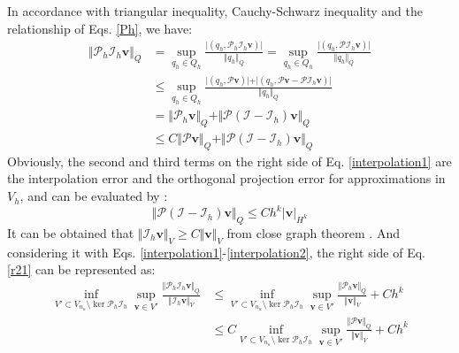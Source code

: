 \begin{pf}
In accordance with triangular inequality, Cauchy-Schwarz inequality and the relationship of Eqs. \eqref{Ph}, we have:
\begin{equation}\label{interpolation1}
\begin{split}
    \Vert \mathcal P_h \mathcal I_h \boldsymbol v \Vert_Q &= 
    \sup_{q_h \in Q_h} \frac{\vert (q_h, \mathcal P_h \mathcal I_h \boldsymbol v) \vert}{\Vert q_h \Vert_Q}
    =\sup_{q_h \in Q_h} \frac{\vert (q_h, \mathcal P \mathcal I_h \boldsymbol v) \vert}{\Vert q_h \Vert_Q} \\
    &\le \sup_{q_h \in Q_h} \frac{\vert (q_h, \mathcal P \boldsymbol v)\vert + \vert (q_h, \mathcal P \boldsymbol v - \mathcal P \mathcal I_h \boldsymbol v) \vert}{\Vert q_h \Vert_Q} \\
    &= \Vert \mathcal P_h \boldsymbol v \Vert_Q
    + \Vert \mathcal P(\mathcal I - \mathcal I_h) \boldsymbol v \Vert_Q \\
    &\le C \Vert \mathcal P \boldsymbol v \Vert_Q
    + \Vert \mathcal P(\mathcal I - \mathcal I_h) \boldsymbol v \Vert_Q 
\end{split}
\end{equation}
Obviously, the second and third terms on the right side of Eq. \eqref{interpolation1} are the interpolation error and the orthogonal projection error for approximations in $V_h$, and can be evaluated by \cite{yosida1995}:
\begin{equation}
\label{interpolation2}
    \Vert \mathcal P(\mathcal I - \mathcal I_h) \boldsymbol v \Vert_Q \le Ch^k \vert \boldsymbol v \vert_{H^k} 
\end{equation}
    It can be obtained that $\Vert \mathcal I_h \boldsymbol v\Vert_V \ge C\Vert \boldsymbol v \Vert_V$ from close graph theorem \cite{quarteroni1994}. And considering it with Eqs. \eqref{interpolation1}-\eqref{interpolation2}, the right side of Eq. \eqref{r21} can be represented as:
\begin{equation}\label{r23}
\begin{split}
    \inf_{V'\subset V_{n_u}\setminus \ker \mathcal P_h \mathcal I_h} \sup_{\boldsymbol v \in V'} \frac{\Vert \mathcal P_h\mathcal I_h\boldsymbol v\Vert_Q}{\Vert \mathcal I_h \boldsymbol v\Vert_V} 
    &\le \inf_{V'\subset V_{n_u}\setminus \ker \mathcal P_h \mathcal I_h} \sup_{\boldsymbol v \in V'} \frac{\Vert \mathcal P_h \boldsymbol v\Vert_Q}{\Vert \boldsymbol v\Vert_V} + Ch^k \\
    &\le C \inf_{V'\subset V_{n_u}\setminus \ker \mathcal P_h \mathcal I_h} \sup_{\boldsymbol v \in V'} \frac{\Vert \mathcal P\boldsymbol v\Vert_Q}{\Vert \boldsymbol v\Vert_V} + Ch^k \\

\end{split}
\end{equation}
\end{pf}

